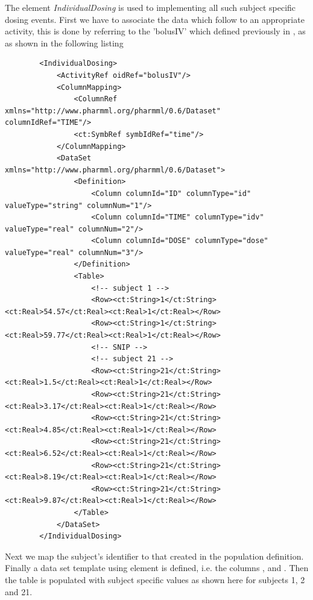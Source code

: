 The element \textit{IndividualDosing} is used to implementing all such subject specific
dosing events. First we have to associate the data which follow to an appropriate activity,
this is done by referring to the 'bolusIV' which defined previously in , as 
as shown in the following listing 
\lstset{language=XML}
\begin{lstlisting}
        <IndividualDosing>
            <ActivityRef oidRef="bolusIV"/>
            <ColumnMapping>
                <ColumnRef xmlns="http://www.pharmml.org/pharmml/0.6/Dataset" columnIdRef="TIME"/>
                <ct:SymbRef symbIdRef="time"/>
            </ColumnMapping>
            <DataSet xmlns="http://www.pharmml.org/pharmml/0.6/Dataset">
                <Definition>
                    <Column columnId="ID" columnType="id" valueType="string" columnNum="1"/>
                    <Column columnId="TIME" columnType="idv" valueType="real" columnNum="2"/>
                    <Column columnId="DOSE" columnType="dose" valueType="real" columnNum="3"/>
                </Definition>
                <Table>
                    <!-- subject 1 -->
                    <Row><ct:String>1</ct:String><ct:Real>54.57</ct:Real><ct:Real>1</ct:Real></Row> 
                    <Row><ct:String>1</ct:String><ct:Real>59.77</ct:Real><ct:Real>1</ct:Real></Row> 
                    <!-- SNIP -->
                    <!-- subject 21 -->
                    <Row><ct:String>21</ct:String><ct:Real>1.5</ct:Real><ct:Real>1</ct:Real></Row> 
                    <Row><ct:String>21</ct:String><ct:Real>3.17</ct:Real><ct:Real>1</ct:Real></Row> 
                    <Row><ct:String>21</ct:String><ct:Real>4.85</ct:Real><ct:Real>1</ct:Real></Row> 
                    <Row><ct:String>21</ct:String><ct:Real>6.52</ct:Real><ct:Real>1</ct:Real></Row> 
                    <Row><ct:String>21</ct:String><ct:Real>8.19</ct:Real><ct:Real>1</ct:Real></Row> 
                    <Row><ct:String>21</ct:String><ct:Real>9.87</ct:Real><ct:Real>1</ct:Real></Row> 
                </Table>
            </DataSet>
        </IndividualDosing>
\end{lstlisting}

Next we map the subject's identifier  to that created in the population definition. 
Finally a data set template using  element is defined, 
i.e. the columns ,  and .
Then the table is populated with subject specific values as shown here for subjects 1, 2 and 21.


